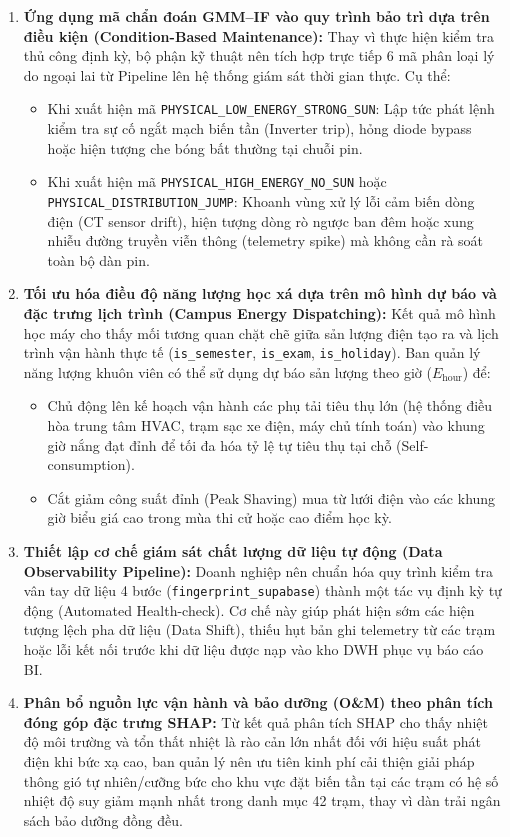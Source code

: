 \documentclass[12pt, a4paper]{report}
\begin{document}
\begin{enumerate}
    \item \textbf{Ứng dụng mã chẩn đoán GMM--IF vào quy trình bảo trì dựa trên điều kiện (Condition-Based Maintenance):} 
    Thay vì thực hiện kiểm tra thủ công định kỳ, bộ phận kỹ thuật nên tích hợp trực tiếp 6 mã phân loại lý do ngoại lai từ Pipeline lên hệ thống giám sát thời gian thực. Cụ thể:
    \begin{itemize}
        \item Khi xuất hiện mã \texttt{PHYSICAL\_LOW\_ENERGY\_STRONG\_SUN}: Lập tức phát lệnh kiểm tra sự cố ngắt mạch biến tần (Inverter trip), hỏng diode bypass hoặc hiện tượng che bóng bất thường tại chuỗi pin.
        \item Khi xuất hiện mã \texttt{PHYSICAL\_HIGH\_ENERGY\_NO\_SUN} hoặc 
        \texttt{PHYSICAL\_DISTRIBUTION\_JUMP}: Khoanh vùng xử lý lỗi cảm biến dòng điện (CT sensor drift), hiện tượng dòng rò ngược ban đêm hoặc xung nhiễu đường truyền viễn thông (telemetry spike) mà không cần rà soát toàn bộ dàn pin.
    \end{itemize}

    \item \textbf{Tối ưu hóa điều độ năng lượng học xá dựa trên mô hình dự báo và đặc trưng lịch trình (Campus Energy Dispatching):} 
    Kết quả mô hình học máy cho thấy mối tương quan chặt chẽ giữa sản lượng điện tạo ra và lịch trình vận hành thực tế (\texttt{is\_semester}, \texttt{is\_exam}, \texttt{is\_holiday}). Ban quản lý năng lượng khuôn viên có thể sử dụng dự báo sản lượng theo giờ ($E_{\text{hour}}$) để:
    \begin{itemize}
        \item Chủ động lên kế hoạch vận hành các phụ tải tiêu thụ lớn (hệ thống điều hòa trung tâm HVAC, trạm sạc xe điện, máy chủ tính toán) vào khung giờ nắng đạt đỉnh để tối đa hóa tỷ lệ tự tiêu thụ tại chỗ (Self-consumption).
        \item Cắt giảm công suất đỉnh (Peak Shaving) mua từ lưới điện vào các khung giờ biểu giá cao trong mùa thi cử hoặc cao điểm học kỳ.
    \end{itemize}

    \item \textbf{Thiết lập cơ chế giám sát chất lượng dữ liệu tự động (Data Observability Pipeline):} 
    Doanh nghiệp nên chuẩn hóa quy trình kiểm tra vân tay dữ liệu 4 bước (\texttt{fingerprint\_supabase}) thành một tác vụ định kỳ tự động (Automated Health-check). Cơ chế này giúp phát hiện sớm các hiện tượng lệch pha dữ liệu (Data Shift), thiếu hụt bản ghi telemetry từ các trạm hoặc lỗi kết nối trước khi dữ liệu được nạp vào kho DWH phục vụ báo cáo BI.

    \item \textbf{Phân bổ nguồn lực vận hành và bảo dưỡng (O\&M) theo phân tích đóng góp đặc trưng SHAP:} 
    Từ kết quả phân tích SHAP cho thấy nhiệt độ môi trường và tổn thất nhiệt là rào cản lớn nhất đối với hiệu suất phát điện khi bức xạ cao, ban quản lý nên ưu tiên kinh phí cải thiện giải pháp thông gió tự nhiên/cưỡng bức cho khu vực đặt biến tần tại các trạm có hệ số nhiệt độ suy giảm mạnh nhất trong danh mục 42 trạm, thay vì dàn trải ngân sách bảo dưỡng đồng đều.
\end{enumerate}
\end{document}
